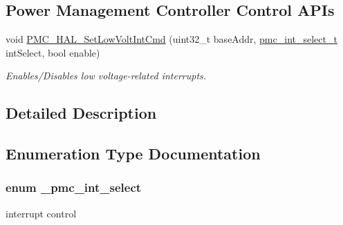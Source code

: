 \subsection*{Power Management Controller Control A\+P\+Is}
\begin{DoxyCompactItemize}
\item 
void \hyperlink{group__pmc__hal_gacb96af04f972cc2c762615c9b50ec02d}{P\+M\+C\+\_\+\+H\+A\+L\+\_\+\+Set\+Low\+Volt\+Int\+Cmd} (uint32\+\_\+t base\+Addr, \hyperlink{group__pmc__hal_ga1db67d1d76b8a50a72700ffc5eff3191}{pmc\+\_\+int\+\_\+select\+\_\+t} int\+Select, bool enable)
\begin{DoxyCompactList}\small\item\em Enables/\+Disables low voltage-\/related interrupts. \end{DoxyCompactList}\end{DoxyCompactItemize}


\subsection{Detailed Description}


\subsection{Enumeration Type Documentation}
\subsubsection[{\texorpdfstring{\+\_\+pmc\+\_\+int\+\_\+select}{_pmc_int_select}}]{\setlength{\rightskip}{0pt plus 5cm}enum {\bf \+\_\+pmc\+\_\+int\+\_\+select}}\hypertarget{group__pmc__hal_ga9b861bcdeda11a0e03077a7b913a3cb0}{}\label{group__pmc__hal_ga9b861bcdeda11a0e03077a7b913a3cb0}


interrupt control 

